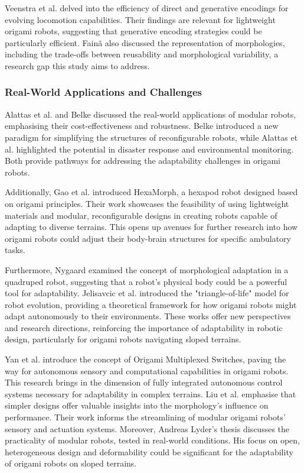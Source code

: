 \documentclass{sigchi}
\begin{document}
Veenstra et al. delved into the efficiency of direct and generative encodings for evolving locomotion capabilities\cite{liu_impact_2017}. Their findings are relevant for lightweight origami robots, suggesting that generative encoding strategies could be particularly efficient. Fainã also discussed the representation of morphologies, including the trade-offs between reusability and morphological variability, a research gap this study aims to address\cite{faina_evolving_2021}.


\subsubsection{Real-World Applications and Challenges}

Alattas et al. and Belke discussed the real-world applications of modular robots, emphasising their cost-effectiveness and robustness\cite{alattas_evolutionary_2019}. Belke introduced a new paradigm for simplifying the structures of reconfigurable robots\cite{belke_modular_2020}, while Alattas et al. highlighted the potential in disaster response and environmental monitoring. Both provide pathways for addressing the adaptability challenges in origami robots.


Additionally, Gao et al. introduced HexaMorph, a hexapod robot designed based on origami principles\cite{gao_hexamorph_2014}. Their work showcases the feasibility of using lightweight materials and modular, reconfigurable designs in creating robots capable of adapting to diverse terrains. This opens up avenues for further research into how origami robots could adjust their body-brain structures for specific ambulatory tasks.

Furthermore, Nygaard examined the concept of morphological adaptation in a quadruped robot, suggesting that a robot's physical body could be a powerful tool for adaptability\cite{nygaard_legging_2020}. Jelisavcic et al. introduced the "triangle-of-life" model for robot evolution, providing a theoretical framework for how origami robots might adapt autonomously to their environments\cite{jelisavcic_real-world_2017}. These works offer new perspectives and research directions, reinforcing the importance of adaptability in robotic design, particularly for origami robots navigating sloped terrains.

Yan et al. introduce the concept of Origami Multiplexed Switches, paving the way for autonomous sensory and computational capabilities in origami robots\cite{yan_origami-based_2023}. This research brings in the dimension of fully integrated autonomous control systems necessary for adaptability in complex terrains. Liu et al. emphasise that simpler designs offer valuable insights into the morphology's influence on performance\cite{liu_impact_2017}. Their work informs the streamlining of modular origami robots' sensory and actuation systems. Moreover, Andreas Lyder's thesis discusses the practicality of modular robots, tested in real-world conditions\cite{lyder_towards_2010}. His focus on open, heterogeneous design and deformability could be significant for the adaptability of origami robots on sloped terrains.
\end{document}
